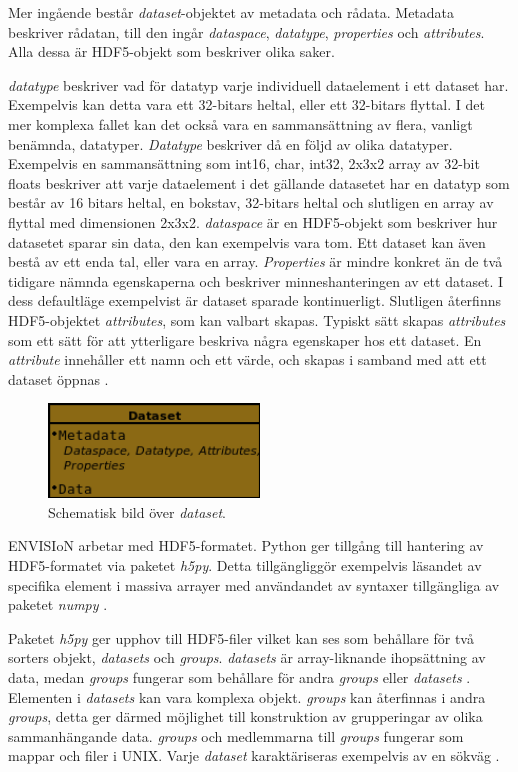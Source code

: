 \documentclass[10pt,oneside,swedish]{article}
\begin{document}
Mer ingående består \emph{dataset}-objektet av metadata och rådata.
Metadata beskriver rådatan, till den ingår \emph{dataspace},
\emph{datatype}, \emph{properties} och \emph{attributes}. Alla dessa är
HDF5-objekt som beskriver olika saker.

\emph{datatype} beskriver vad för datatyp varje individuell dataelement
i ett dataset har. Exempelvis kan detta vara ett 32-bitars heltal, eller
ett 32-bitars flyttal. I det mer komplexa fallet kan det också vara en
sammansättning av flera, vanligt benämnda, datatyper. \emph{Datatype}
beskriver då en följd av olika datatyper. Exempelvis en sammansättning
som int16, char, int32, 2x3x2 array av 32-bit floats beskriver att varje
dataelement i det gällande datasetet har en datatyp som består av 16
bitars heltal, en bokstav, 32-bitars heltal och slutligen en array av
flyttal med dimensionen 2x3x2. \emph{dataspace} är en HDF5-objekt som
beskriver hur datasetet sparar sin data, den kan exempelvis vara tom.
Ett dataset kan även bestå av ett enda tal, eller vara en array.
\emph{Properties} är mindre konkret än de två tidigare nämnda
egenskaperna och beskriver minneshanteringen av ett dataset. I dess
defaultläge exempelvist är dataset sparade kontinuerligt. Slutligen
återfinns HDF5-objektet \emph{attributes}, som kan valbart skapas.
Typiskt sätt skapas \emph{attributes} som ett sätt för att ytterligare
beskriva några egenskaper hos ett dataset. En \emph{attribute}
innehåller ett namn och ett värde, och skapas i samband med att ett
dataset öppnas \cite{HDFGroup2}.

\begin{figure}[H]\label{}
\centering
\includegraphics[width=0.50000\textwidth]{Images/Dataset_Metadata_HDF5.png}
\caption{Schematisk bild över \emph{dataset}.}
\end{figure}

ENVISIoN arbetar med HDF5-formatet. Python ger tillgång till hantering
av HDF5-formatet via paketet \emph{h5py}. Detta tillgängliggör
exempelvis läsandet av specifika element i massiva arrayer med
användandet av syntaxer tillgängliga av paketet \emph{numpy} \cite{HowToUseHDF5FilesinPython}.

Paketet \emph{h5py} ger upphov till HDF5-filer vilket kan ses som
behållare för två sorters objekt, \emph{datasets} och \emph{groups}.
\emph{datasets} är array-liknande ihopsättning av data, medan
\emph{groups} fungerar som behållare för andra \emph{groups} eller
\emph{datasets} \cite{HowToUseHDF5FilesinPython}. Elementen i
\emph{datasets} kan vara komplexa objekt. \emph{groups} kan återfinnas i
andra \emph{groups}, detta ger därmed möjlighet till konstruktion av
grupperingar av olika sammanhängande data. \emph{groups} och medlemmarna
till \emph{groups} fungerar som mappar och filer i UNIX. Varje
\emph{dataset} karaktäriseras exempelvis av en sökväg \cite{HDFGroup2}.
\end{document}
